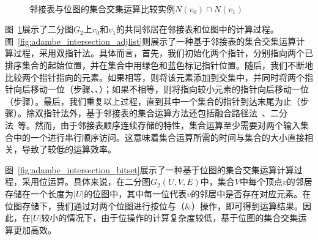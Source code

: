 

\begin{figure} [t]
	\centering
  \\

	\caption{邻接表与位图的集合交集运算比较实例$N(v_0)\cap N(v_1)$}
	
	\label{fig:adambe_intersection}
\end{figure}


\begin{example}
	
	图~\ref{fig:adambe_intersection}展示了二分图$G_2$上$v_0$和$v_1$的共同邻居在邻接表和位图中的计算过程。图~\ref{fig:adambe_intersection_adjlist}则展示了一种基于邻接表的集合交集运算计算过程，采用双指针法。具体而言，首先，我们初始化两个指针，分别指向两个已排序集合的起始位置，并在集合中用绿色和蓝色标记指针位置。随后，我们不断地比较两个指针指向的元素。如果相等，则将该元素添加到交集中，并同时将两个指针向后移动一位（步骤、、）；如果不相等，则将指向较小元素的指针向后移动一位（步骤）。最后，我们重复以上过程，直到其中一个集合的指针到达末尾为止（步骤）。除双指针法外，基于邻接表的集合运算方法还包括融合路径法~\cite{GpuMergePathIntersect14,MergePath18}、二分法~\cite{BinaryIntersect18,triangle18}等。然而，由于邻接表顺序连续存储的特性，集合运算至少需要对两个输入集合中的一个进行串行顺序访问。这意味着集合运算所需的时间与集合的大小直接相关，导致了较低的运算效率。
	
	图~\ref{fig:adambe_intersection_bitset}展示了一种基于位图的集合交集运算计算过程，采用位运算。具体来说，在二分图$G_2(U,V,E)$中，集合$V$中每个顶点$v$的邻居存储在一个长度为$|U|$的位图中，其中每一位代表$v$的邻居中是否存在对应元素。在位图存储下，我们通过对两个位图进行按位与（\&）操作，即可得到运算结果。因此，在$|U|$较小的情况下，由于位操作的计算复杂度较低，基于位图的集合交集运算更加高效。

\end{example}

